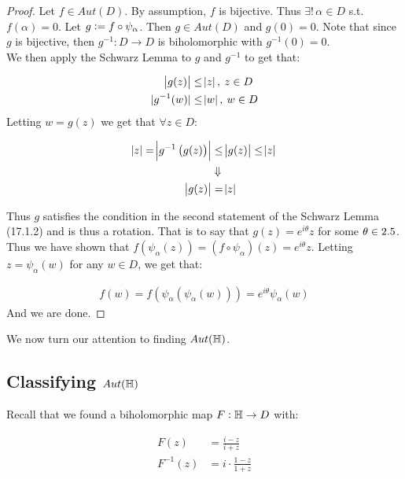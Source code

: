 \begin{proof}
Let $f \in Aut(D)$. By assumption, $f$ is bijective. Thus $\exists ! \, \alpha \in D$ s.t. $ f(\alpha) = 0$. Let $g \vcentcolon = f \circ \psi_\alpha$. Then $g \in Aut(D)$ and $g(0) = 0$. Note that since $g$ is bijective, then $g^{-1} : D \to D$ is biholomorphic with $g^{-1}(0) = 0$.\\

We then apply the Schwarz Lemma to $g$ and $g^{-1}$ to get that:

\begin{align*}
    \abs{g(z)} &\leq \abs{z}, \: z \in D\\
    |g^{-1} ( w) | &\leq \abs{w}, \: w \in D
\end{align*}
Letting $w = g(z)$ we get that $\forall z \in D$:

\begin{align*}
    \abs{z} = \abs{g^{-1} \left( g(z) \right)   } &\leq \abs{g(z)} \leq \abs{z}\\
    &\Downarrow\\
    \abs{g(z)} &= \abs{z}
\end{align*}

Thus $g$ satisfies the condition in the second statement of the Schwarz Lemma (17.1.2) and is thus a rotation. That is to say that $g(z) = e^{i \theta} z $ for some $\theta \in 2.5$. Thus we have shown that $f \left( \psi_\alpha (z) \right) = \left( f \circ \psi_\alpha \right) (z) = e^{i \theta} z$. Letting $z = \psi_\alpha (w)$ for any $w \in D$, we get that:

\begin{align*}
   f(w) = f \left( \psi_\alpha \left( \psi_\alpha (w) \right) \right) = e^{i \theta} \psi_\alpha (w)
\end{align*}
And we are done.
\end{proof}




We now turn our attention to finding $Aut(\mathbb{H})$.

\subsection{Classifying $Aut(\mathbb{H})$}

Recall that we found a biholomorphic map $F:\mathbb{H} \to D$ with:

\begin{align*}
    F(z) &= \frac{i-z}{i+z}\\
    F^{-1} (z) &= i \cdot \frac{1-z}{1+z}
\end{align*}

